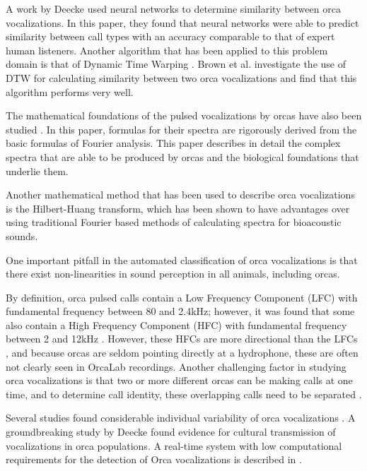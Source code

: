 A work by Deecke \cite{deecke1999quantifying} used neural networks to
determine similarity between orca vocalizations.  In this paper, they
found that neural networks were able to predict similarity between
call types with an accuracy comparable to that of expert human
listeners.  Another algorithm that has been applied to this problem
domain is that of Dynamic Time Warping \cite{deecke2006pitfalls}.
Brown et al. \cite{brown2006classifying} \cite{brown2007dtw}
investigate the use of DTW for calculating similarity between two orca
vocalizations and find that this algorithm performs very well.

The mathematical foundations of the pulsed vocalizations by orcas have
also been studied \cite{brown2008math}.  In this paper, formulas for
their spectra are rigorously derived from the basic formulas of
Fourier analysis.  This paper describes in detail the complex spectra
that are able to be produced by orcas and the biological foundations
that underlie them.

Another mathematical method that has been used to describe orca
vocalizations is the Hilbert-Huang transform, which has been shown
\cite{adam2006hilbert} to have advantages over using traditional
Fourier based methods of calculating spectra for bioacoustic sounds.

One important pitfall in the automated classification of orca
vocalizations is that there exist non-linearities in sound perception
in all animals, including orcas\cite{nummela1999anatomy}.

By definition, orca pulsed calls contain a Low Frequency Component
(LFC) with fundamental frequency between 80 and 2.4kHz; however, it
was found that some also contain a High Frequency Component (HFC) with
fundamental frequency between 2 and 12kHz \cite{hoelzel1986call}.
However, these HFCs are more directional than the LFCs
\cite{miller2002mixed}, and because orcas are seldom pointing directly
at a hydrophone, these are often not clearly seen in OrcaLab
recordings.  Another challenging factor in studying orca vocalizations
is that two or more different orcas can be making calls at one time,
and to determine call identity, these overlapping calls need to be
separated \cite{ford1987catalogue}.

Several studies found considerable individual variability of orca
vocalizations \cite{miller2000orca} \cite{nousek2006social}
\cite{parijs2004norwegian}.  A groundbreaking study by Deecke
\cite{deecke2000dialect} found evidence for cultural transmission
of vocalizations in orca populations.  A real-time system with low
computational requirements for the detection of Orca vocalizations is
described in \cite{luke2010realtime}.

